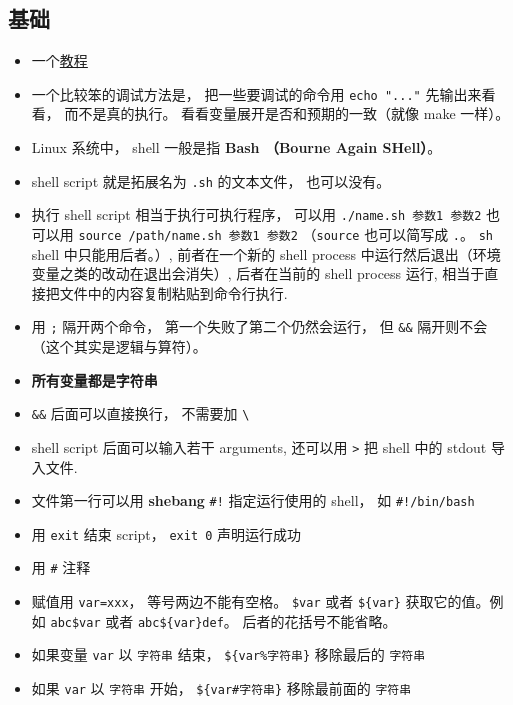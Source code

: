
\begin{issues}
\issueDraft
\end{issues}


\subsection{基础}
\begin{itemize}
\item 一个\href{https://tldp.org/LDP/abs/html/why-shell.html}{教程}
\item 一个比较笨的调试方法是， 把一些要调试的命令用 \verb`echo "..."` 先输出来看看， 而不是真的执行。 看看变量展开是否和预期的一致（就像 make 一样）。
\item Linux 系统中， shell 一般是指 \textbf{Bash （Bourne Again SHell）}。
\item shell script 就是拓展名为 \verb`.sh` 的文本文件， 也可以没有。
\item 执行 shell script 相当于执行可执行程序， 可以用 \verb`./name.sh 参数1 参数2` 也可以用 \verb`source /path/name.sh 参数1 参数2` （\verb`source` 也可以简写成 \verb`.`。 \verb`sh` shell 中只能用后者。）, 前者在一个新的 shell process 中运行然后退出（环境变量之类的改动在退出会消失）, 后者在当前的 shell process 运行, 相当于直接把文件中的内容复制粘贴到命令行执行.
\item 用 \verb`;` 隔开两个命令， 第一个失败了第二个仍然会运行， 但 \verb`&&` 隔开则不会（这个其实是逻辑与算符）。
\item \textbf{所有变量都是字符串}
\item \verb`&&` 后面可以直接换行， 不需要加 \verb`\`
\item shell script 后面可以输入若干 arguments, 还可以用 \verb`>` 把 shell 中的 stdout 导入文件.
\item 文件第一行可以用 \textbf{shebang} \verb`#!` 指定运行使用的 shell， 如 \verb`#!/bin/bash`
\item 用 \verb`exit` 结束 script， \verb`exit 0` 声明运行成功
\item 用 \verb`#` 注释
\item 赋值用 \verb`var=xxx`， 等号两边不能有空格。 \verb`$var` 或者 \verb`${var}` 获取它的值。例如 \verb`abc$var` 或者 \verb`abc${var}def`。 后者的花括号不能省略。
\
\item 如果变量 \verb`var` 以 \verb`字符串` 结束， \verb`${var%字符串}` 移除最后的 \verb`字符串`
\item 如果 \verb`var` 以 \verb`字符串` 开始， \verb`${var#字符串}` 移除最前面的 \verb`字符串`

\end{itemize}
